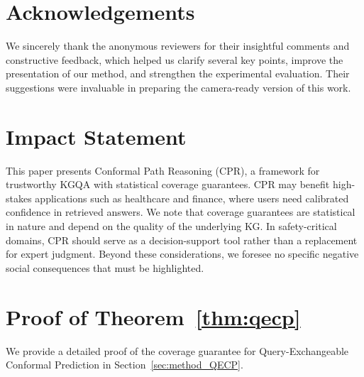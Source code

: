 \documentclass{article}
\theoremstyle{plain}
\theoremstyle{definition}
\theoremstyle{remark}
\begin{document}
\newpage
\section*{Acknowledgements}
We sincerely thank the anonymous reviewers for their insightful comments and constructive feedback, which helped us clarify several key points, improve the presentation of our method, and strengthen the experimental evaluation. Their suggestions were invaluable in preparing the camera-ready version of this work.

\section*{Impact Statement}
This paper presents Conformal Path Reasoning (CPR), a framework for trustworthy KGQA with statistical coverage guarantees. CPR may benefit high-stakes applications such as healthcare and finance, where users need calibrated confidence in retrieved answers. We note that coverage guarantees are statistical in nature and depend on the quality of the underlying KG. In safety-critical domains, CPR should serve as a decision-support tool rather than a replacement for expert judgment. Beyond these considerations, we foresee no specific negative social consequences that must be highlighted.






\clearpage
\appendix
\section{Proof of Theorem~\ref{thm:qecp}}
\label{app:proof}

We provide a detailed proof of the coverage guarantee for Query-Exchangeable Conformal Prediction in Section~\ref{sec:method_QECP}.
\end{document}
